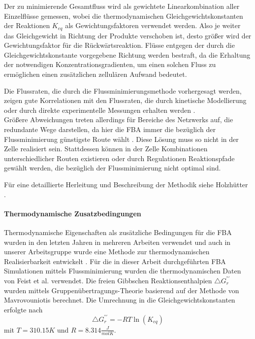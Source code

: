 Der zu minimierende Gesamtfluss wird als gewichtete Linearkombination aller Einzelflüsse gemessen, wobei die thermodynamischen Gleichgewichtskonstanten der Reaktionen $K_{eq}$ als Gewichtungsfaktoren verwendet werden. Also je weiter das Gleichgewicht in Richtung der Produkte verschoben ist, desto größer wird der Gewichtungsfaktor für die Rückwärtsreaktion. Flüsse entgegen der durch die Gleichgewichtskonstante vorgegebene Richtung werden bestraft, da die Erhaltung der notwendigen Konzentrationsgradienten, um einen solchen Fluss zu ermöglichen einen zusätzlichen zellulären Aufwand bedeutet.

Die Flussraten, die durch die Flussminimierungsmethode vorhergesagt werden, zeigen gute Korrelationen mit den Flussraten, die durch kinetische Modellierung oder durch direkte experimentelle Messungen erhalten werden \cite{Holzhuetter2004}.\\
Größere Abweichungen treten allerdings für Bereiche des Netzwerks auf, die redundante Wege darstellen, da hier die FBA immer die bezüglich der Flussminimierung günstigste Route wählt \cite{Holzhuetter2004}. Diese Lösung muss so nicht in der Zelle realisiert sein. Stattdessen können in der Zelle Kombinationen unterschiedlicher Routen existieren oder durch Regulationen Reaktionspfade gewählt werden, die bezüglich der Flussminimierung nicht optimal sind.

Für eine detaillierte Herleitung und Beschreibung der Methodik siehe Holzhütter \cite{Holzhuetter2004}.

\paragraph{Thermodynamische Zusatzbedingungen}
Thermodynamische Eigenschaften als zusätzliche Bedingungen für die FBA wurden in den letzten Jahren in mehreren Arbeiten verwendet \cite{Feist2007, Henry2007, Kuemmel2006} und auch in unserer Arbeitsgruppe wurde eine Methode zur thermodynamischen Realisierbarkeit entwickelt \cite{Hoppe2007}. 
Für die in dieser Arbeit durchgeführten FBA Simulationen mittels Flussminimierung wurden die thermodynamischen Daten von Feist et al. \cite{Feist2007} verwendet. Die freien Gibbschen Reaktionsenthalpien $\bigtriangleup G_r^{°'}$ wurden mittels Gruppenübertragungs-Theorie \cite{Jankowski2008} basierend auf der Methode von Mavrovouniotis \cite{Mavrovouniotis1990, Mavrovouniotis1991} berechnet.
Die Umrechnung in die Gleichgewichtskonstanten erfolgte nach
\begin{equation}
\bigtriangleup G_r^{°'} = - RT \ln(K_{eq})
\end{equation}
mit $T=310.15 \unit{K}$ und $R=8.314 \unit{\frac{J}{mol K}}$.

